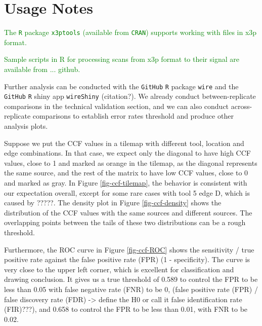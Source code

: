 \documentclass[fleqn,10pt]{wlscirep}
\newcommand{\tom}[1]{{\textcolor{RedOrange}{#1}}}
\newcommand{\hh}[1]{{\textcolor{Green}{#1}}}
\begin{document}
\section*{Usage Notes}\label{sec-usage-notes}

\hh{The \texttt{R} package \texttt{x3ptools} (available from \texttt{CRAN}) supports working with files in  x3p format. }

\hh{Sample scripts in R for processing scans from x3p format to their signal are available from ... github. }

Further analysis can be conducted with the \texttt{GitHub} \texttt{R}
package \texttt{wire} and the \texttt{GitHub} \texttt{R} shiny app
\texttt{wireShiny} \tom{(citation?)}. We already conduct
between-replicate comparisons in the technical validation section, and
we can also conduct across-replicate comparisons to establish error
rates threshold and produce other analysis plots.

Suppose we put the CCF values in a tilemap with different tool, location
and edge combinations. In that case, we expect only the diagonal to have
high CCF values, close to 1 and marked as orange in the tilemap, as the
diagonal represents the same source, and the rest of the matrix to have
low CCF values, close to 0 and marked as gray. In Figure
\ref{fig-ccf-tilemap}, the behavior is consistent with our expectation
overall, except for some rare cases with tool 5 edge D, which is caused
by \tom{?????}. The density plot in Figure \ref{fig-ccf-density} shows
the distribution of the CCF values with the same sources and different
sources. The overlapping points between the tails of these two
distributions can be a rough threshold.

Furthermore, the ROC curve in Figure \ref{fig-ccf-ROC} shows the
sensitivity / true positive rate against the false positive rate (FPR)
(1 - specificity). The curve is very close to the upper left corner,
which is excellent for classification and drawing conclusion. It gives
us a true threshold of 0.589 to control the FPR to be less than 0.05
with false negative rate (FNR) to be 0,
\tom{(false positive rate (FPR) / false discovery rate (FDR) -> define the H0 or call it false identification rate (FIR)???)},
and 0.658 to control the FPR to be less than 0.01, with FNR to be 0.02.
\end{document}
